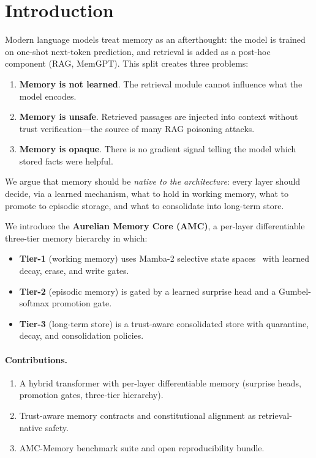 \section{Introduction}
\label{sec:intro}

Modern language models treat memory as an afterthought: the model is
trained on one-shot next-token prediction, and retrieval is added as a
post-hoc component (RAG, MemGPT). This split creates three problems:
\begin{enumerate}
  \item \textbf{Memory is not learned}. The retrieval module cannot
        influence what the model encodes.
  \item \textbf{Memory is unsafe}. Retrieved passages are injected
        into context without trust verification---the source of many
        RAG poisoning attacks.
  \item \textbf{Memory is opaque}. There is no gradient signal
        telling the model which stored facts were helpful.
\end{enumerate}

We argue that memory should be \emph{native to the architecture}:
every layer should decide, via a learned mechanism, what to hold in
working memory, what to promote to episodic storage, and what to
consolidate into long-term store.

We introduce the \textbf{Aurelian Memory Core (AMC)}, a per-layer
differentiable three-tier memory hierarchy in which:
\begin{itemize}
  \item \textbf{Tier-1} (working memory) uses Mamba-2 selective state
        spaces~\citep{dao2024transformers} with learned decay, erase,
        and write gates.
  \item \textbf{Tier-2} (episodic memory) is gated by a learned
        surprise head and a Gumbel-softmax promotion gate.
  \item \textbf{Tier-3} (long-term store) is a trust-aware consolidated
        store with quarantine, decay, and consolidation policies.
\end{itemize}

\paragraph{Contributions.}
\begin{enumerate}
  \item A hybrid transformer with per-layer differentiable memory
        (surprise heads, promotion gates, three-tier hierarchy).
  \item Trust-aware memory contracts and constitutional alignment as
        retrieval-native safety.
  \item AMC-Memory benchmark suite and open reproducibility bundle.
\end{enumerate}

